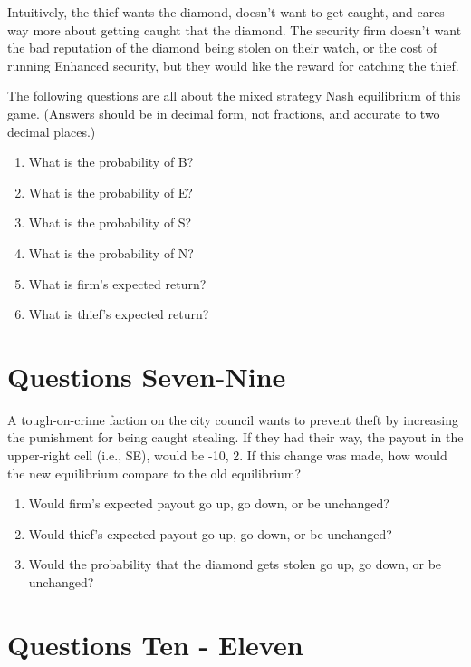 \documentclass[
  11pt,
]{article}
\providecommand{\tightlist}{%
  \setlength{\itemsep}{0pt}\setlength{\parskip}{0pt}}
\begin{document}
Intuitively, the thief wants the diamond, doesn't want to get caught,
and cares way more about getting caught that the diamond. The security
firm doesn't want the bad reputation of the diamond being stolen on
their watch, or the cost of running Enhanced security, but they would
like the reward for catching the thief.

The following questions are all about the mixed strategy Nash
equilibrium of this game. (Answers should be in decimal form, not
fractions, and accurate to two decimal places.)

\begin{enumerate}
\def\labelenumi{\arabic{enumi}.}
\tightlist
\item
  What is the probability of B?
\item
  What is the probability of E?
\item
  What is the probability of S?
\item
  What is the probability of N?
\item
  What is firm's expected return?
\item
  What is thief's expected return?
\end{enumerate}

\hypertarget{questions-seven-nine}{%
\section{Questions Seven-Nine}\label{questions-seven-nine}}

A tough-on-crime faction on the city council wants to prevent theft by
increasing the punishment for being caught stealing. If they had their
way, the payout in the upper-right cell (i.e., SE), would be -10, 2. If
this change was made, how would the new equilibrium compare to the old
equilibrium?

\begin{enumerate}
\def\labelenumi{\arabic{enumi}.}
\setcounter{enumi}{6}
\tightlist
\item
  Would firm's expected payout go up, go down, or be unchanged?
\item
  Would thief's expected payout go up, go down, or be unchanged?
\item
  Would the probability that the diamond gets stolen go up, go down, or
  be unchanged?
\end{enumerate}

\hypertarget{questions-ten---eleven}{%
\section{Questions Ten - Eleven}\label{questions-ten---eleven}}
\end{document}

